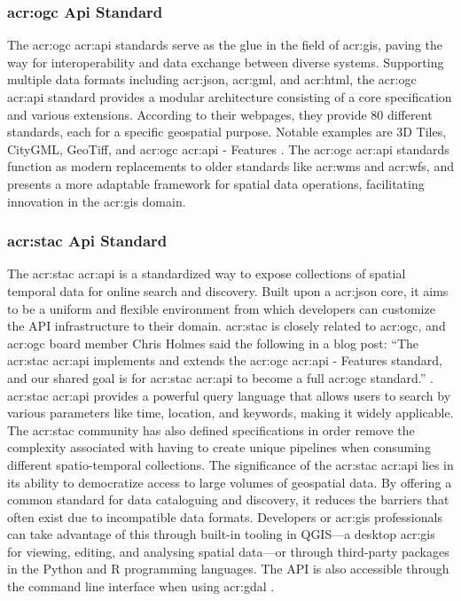 \subsubsection[OGC Standards]{\acrshort{acr:ogc} Api Standard}\label{subsubsec:ogc}

The \gls{acr:ogc} \acrshort{acr:api} standards serve as the glue in the field of \gls{acr:gis}, paving the way for interoperability and data exchange between diverse systems. Supporting multiple data formats including \acrshort{acr:json}, \acrshort{acr:gml}, and \acrshort{acr:html}, the \gls{acr:ogc} \acrshort{acr:api} standard provides a modular architecture consisting of a core specification and various extensions. According to their webpages, they provide 80 different standards, each for a specific geospatial purpose. Notable examples are 3D Tiles, CityGML, GeoTiff, and \acrshort{acr:ogc} \acrshort{acr:api} - Features \citep{ogcOGCStandards2023}. The \acrshort{acr:ogc} \acrshort{acr:api} standards function as modern replacements to older standards like \acrshort{acr:wms} and \acrshort{acr:wfs}, and presents a more adaptable framework for spatial data operations, facilitating innovation in the \acrshort{acr:gis} domain.

\subsubsection[STAC Api Standard]{\acrshort{acr:stac} Api Standard}\label{subsubsec:stac}

The \gls{acr:stac} \acrshort{acr:api} is a standardized way to expose collections of spatial temporal data for online search and discovery. Built upon a \acrshort{acr:json} core, it aims to be a uniform and flexible environment from which developers can customize the API infrastructure to their domain. \acrshort{acr:stac} is closely related to \acrshort{acr:ogc}, and \acrshort{acr:ogc} board member Chris Holmes said the following in a blog post: \enquote{The \acrshort{acr:stac} \acrshort{acr:api} implements and extends the \gls{acr:ogc} \acrshort{acr:api} - Features standard, and our shared goal is for \gls{acr:stac} \acrshort{acr:api} to become a full \gls{acr:ogc} standard.} \citep{holmesSpatioTemporalAssetCatalogs2021}. \gls{acr:stac} \acrshort{acr:api} provides a powerful query language that allows users to search by various parameters like time, location, and keywords, making it widely applicable. The \acrshort{acr:stac} community has also defined specifications in order remove the complexity associated with having to create unique pipelines when consuming different spatio-temporal collections. The significance of the \gls{acr:stac} \acrshort{acr:api} lies in its ability to democratize access to large volumes of geospatial data. By offering a common standard for data cataloguing and discovery, it reduces the barriers that often exist due to incompatible data formats. Developers or \acrshort{acr:gis} professionals can take advantage of this through built-in tooling in QGIS---a desktop \gls{acr:gis} for viewing, editing, and analysing spatial data---or through third-party packages in the Python and R programming languages. The API is also accessible through the command line interface when using \acrshort{acr:gdal} \citep{STACTutorials}.

